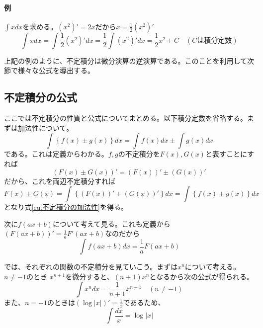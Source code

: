 \documentclass[a4j,dvipdfmx]{jsarticle}
\begin{document}
                \paragraph{例}$\displaystyle\int x dx$を求める。$(x^2)'=2x$だから$x=\frac{1}{2}(x^2)'$
                \begin{equation*}
                    \int x dx = \int \frac{1}{2}(x^2)'dx=\frac{1}{2}\int (x^2)'dx=\frac{1}{2}x^2+C\quad (\text{$C$は積分定数})
                \end{equation*}

                上記の例のように、不定積分は微分演算の逆演算である。このことを利用して次節で様々な公式を導出する。
            \clearpage
            \subsection{不定積分の公式}
                ここでは不定積分の性質と公式についてまとめる。以下積分定数を省略する。まずは加法性について。
                \begin{equation}
                    \int \left\{f(x)\pm g(x)\right\}dx=\int f(x)dx\pm \int g(x)dx \label{eq:不定積分の加法性}
                \end{equation}
                である。これは定義からわかる。$f,g$の不定積分を$F(x),G(x)$と表すことにすれば
                \begin{equation}
                    (F(x)\pm G(x))'=(F(x))'\pm(G(x))'
                \end{equation}
                だから、これを両辺不定積分すれば
                \begin{equation}
                    F(x)\pm G(x)=\int \left\{(F(x))'+(G(x))'\right\}dx=\int \left\{f(x)\pm g(x)\right\}dx
                \end{equation}
                となり式\ref{eq:不定積分の加法性}を得る。

                次に$f(ax+b)$について考えて見る。これも定義から$(F(ax+b))'=\frac{1}{a}F'(ax+b)$なのだから
                \begin{equation}
                    \int f(ax+b)dx=\frac{1}{a}F(ax+b)\label{eq:f(ax+b)の不定積分}
                \end{equation}

                では、それぞれの関数の不定積分を見ていこう。まずは$x^n$について考える。$n\neq -1$のとき
                $x^{n+1}$を微分すると、$(n+1)x^{n}$となるから次の公式が得られる。
                \begin{equation}
                    \int x^n dx = \frac{1}{n+1} x^{n+1}\quad (n\neq -1) \label{eq:x^nの不定積分}
                \end{equation}
                また、$n=-1$のときは$(\log |x|)'=\frac{1}{x}$であるため、
                \begin{equation}
                    \int \frac{dx}{x} = \log |x| \label{eq:1/xの不定積分} 
                \end{equation}
\end{document}
